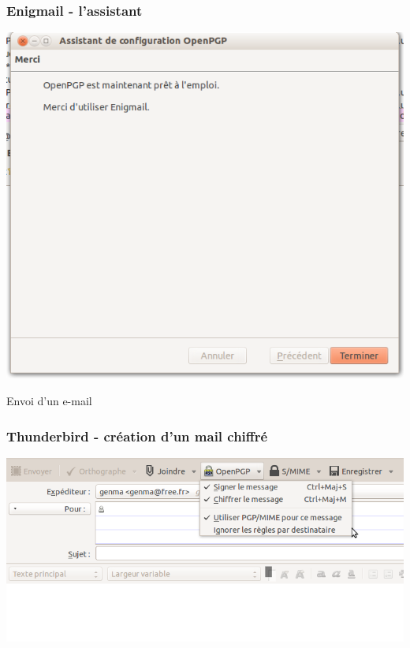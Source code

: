 \documentclass{beamer}
\begin{document}
\begin{frame}
\frametitle{Enigmail - l'assistant}
\begin{center}
\includegraphics[scale=0.3] {./images/Assistant08.png}
\end{center}
\end{frame}

\begin{frame}
\begin{center}
\Huge{Envoi d'un e-mail}
\end{center}
\end{frame}


\begin{frame}
\frametitle{Thunderbird - création d'un mail chiffré}
\begin{center}
\includegraphics[scale=0.4] {./images/Thunderbird04.png}
\end{center}
\begin{itemize}
\end{itemize}
\end{frame}
\end{document}
